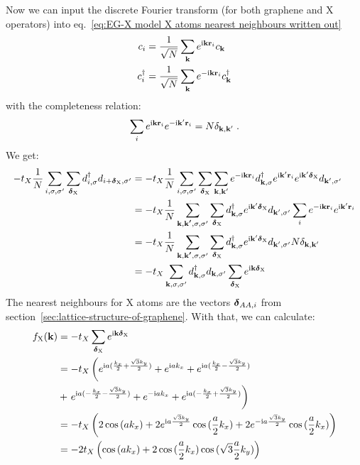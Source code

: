 \documentclass[../main.tex]{subfiles}
\begin{document}
Now we can input the discrete Fourier transform (for both graphene and X operators) into eq.~\ref{eq:EG-X model X atoms nearest neighbours written out}
\begin{align}
    c_{i} &= \frac{1}{\sqrt{N}} \sum_{\bm{\mathrm{k}}} e^{\mathrm{i} \bm{\mathrm{k}} \bm{\mathrm{r}}_{i}} c_{\bm{\mathrm{k}}} \\
    c_{i}^{\dagger} &= \frac{1}{\sqrt{N}} \sum_{\bm{\mathrm{k}}} e^{-\mathrm{i} \bm{\mathrm{k}} \bm{\mathrm{r}}_{i}} c_{\bm{\mathrm{k}}}^{\dagger}
\end{align}
with the completeness relation:
\begin{equation}
    \sum_{i} e^{\mathrm{i} \bm{\mathrm{k}} \bm{\mathrm{r}}_{i}} e^{-\mathrm{i} \bm{\mathrm{k}}^{\prime} \bm{\mathrm{r}}_{i}} = N \delta_{\bm{\mathrm{k}}, \bm{\mathrm{k}}^{\prime}}
    \;.
\end{equation}
We get:
\begin{align}
    -t_X \frac{1}{N} \sum_{i,\sigma, \sigma^{\prime}} \sum_{\bm{\mathrm{\delta}}_{\mathrm{X}}} d_{i, \sigma}^{\dagger} d_{i + \bm{\mathrm{\delta}}_{\mathrm{X}}, \sigma^{\prime}}
    &= -t_X \frac{1}{N} \sum_{i,\sigma, \sigma^{\prime}} \sum_{\bm{\mathrm{\delta}}_{\mathrm{X}}} \sum_{\bm{\mathrm{k}}, \bm{\mathrm{k}}^{\prime}} e^{-\mathrm{i} \bm{\mathrm{k}} \bm{\mathrm{r}}_i} d_{\bm{\mathrm{k}}, \sigma}^{\dagger} e^{\mathrm{i} \bm{\mathrm{k}}^{\prime} \bm{\mathrm{r}}_i} e^{\mathrm{i} \bm{\mathrm{k}}^{\prime} \bm{\mathrm{\delta}}_{\mathrm{X}}} d_{\bm{\mathrm{k}}^{\prime}, \sigma^{\prime}} \\
    &= -t_X \frac{1}{N} \sum_{\bm{\mathrm{k}}, \bm{\mathrm{k^{\prime}}}, \sigma, \sigma^{\prime}} \sum_{\bm{\mathrm{\delta}}_{\mathrm{X}}} d_{\bm{\mathrm{k}}, \sigma}^{\dagger}  e^{\mathrm{i} \bm{\mathrm{k}}^{\prime} \bm{\mathrm{\delta}}_{\mathrm{X}}} d_{\bm{\mathrm{k}}^{\prime}, \sigma^{\prime}} \sum_{i} e^{-\mathrm{i} \bm{\mathrm{k}} \bm{\mathrm{r}}_i} e^{\mathrm{i} \bm{\mathrm{k}}^{\prime} \bm{\mathrm{r}}_i} \\
    &= -t_X \frac{1}{N} \sum_{\bm{\mathrm{k}}, \bm{\mathrm{k^{\prime}}}, \sigma, \sigma^{\prime}} \sum_{\bm{\mathrm{\delta}}_{\mathrm{X}}} d_{\bm{\mathrm{k}}, \sigma}^{\dagger}  e^{\mathrm{i} \bm{\mathrm{k}}^{\prime} \bm{\mathrm{\delta}}_{\mathrm{X}}} d_{\bm{\mathrm{k}}^{\prime}, \sigma^{\prime}} N \delta_{\bm{\mathrm{k}}, \bm{\mathrm{k}}^{\prime}} \\
    &= -t_X \sum_{\bm{\mathrm{k}}, \sigma, \sigma^{\prime}}  d_{\bm{\mathrm{k}}, \sigma}^{\dagger}d_{\bm{\mathrm{k}}, \sigma^{\prime}} \sum_{\bm{\mathrm{\delta}}_{\mathrm{X}}} e^{\mathrm{i} \bm{\mathrm{k}} \bm{\mathrm{\delta}}_{\mathrm{X}}}
\end{align}
The nearest neighbours for \(\mathrm{X}\) atoms are the vectors \(\bm{\mathrm{\delta}}_{AA, i}\) from section~\ref{sec:lattice-structure-of-graphene}.
With that, we can calculate:
\begin{align}
    f_{\mathrm{X}} (\bm{\mathrm{k}}) &= -t_X \sum_{\bm{\mathrm{\delta}}_{\mathrm{X}}} e^{\mathrm{i} \bm{\mathrm{k}} \bm{\mathrm{\delta}}_{\mathrm{X}}} \\
    &= -t_X \left( e^{\mathrm{i} a (\frac{k_x}{2} + \frac{\sqrt{3} k_y}{2})}
    + e^{\mathrm{i} a k_x}
    + e^{\mathrm{i} a (\frac{k_x}{2} - \frac{\sqrt{3} k_y}{2})}
    \right. \\
    &+ \left. e^{\mathrm{i} a (-\frac{k_x}{2} - \frac{\sqrt{3} k_y}{2})}
    + e^{-\mathrm{i} a k_x}
    + e^{\mathrm{i} a (-\frac{k_x}{2} + \frac{\sqrt{3} k_y}{2})} \right) \\
    &= -t_X \left( 2 \cos{(a k_x)} + 2 e^{\mathrm{i} a \frac{\sqrt{3} k_y}{2}} \cos{(\frac{a}{2} k_x)} + 2 e^{-\mathrm{i} a \frac{\sqrt{3} k_y}{2}} \cos{(\frac{a}{2} k_x)} \right) \\
    &= -2t_X \left( \cos{(a k_x)} + 2 \cos{(\frac{a}{2} k_x)} \cos{(\sqrt{3} \frac{ a}{2} k_y)} \right)
\end{align}
\end{document}
